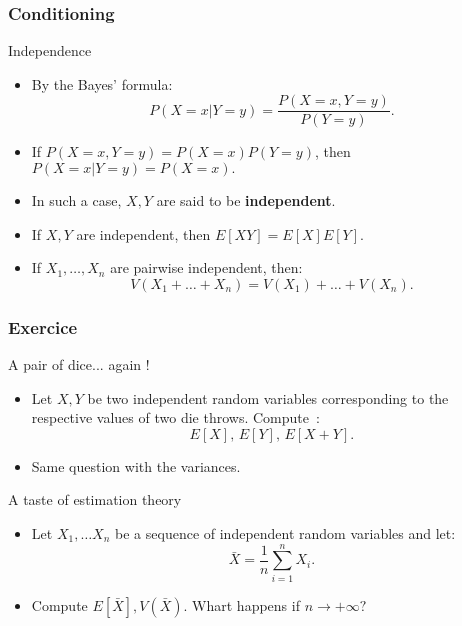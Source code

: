 \begin{frame}
    \frametitle{Conditioning}
\begin{block}{Independence}
    \begin{itemize}
        \item<+-> By the Bayes' formula:
        \begin{equation}
            P\left( X = x \vert Y = y \right) = \frac{P\left( X = x, Y = y \right)}{P(Y=y)}.
        \end{equation}
        \item<+-> If $P\left( X = x, Y = y \right) = P\left( X = x \right)P\left( Y = y \right)$, then
        $P\left( X = x \vert Y = y \right) = P\left( X = x \right).$
        \item<+-> In such a case, $X,Y$ are said to be \textbf{independent}.
        \item<+-> If $X,Y$ are independent, then $E\left[ XY \right] = E[X]E[Y].$
        \item<+-> If $X_1, \dots, X_n$ are pairwise independent, then:
        \begin{equation}
            V\left( X_1 + \dots + X_n \right) = V\left( X_1 \right) + \dots + V\left( X_n \right).
        \end{equation}
    \end{itemize}
\end{block}
\end{frame}
\begin{frame}
    \frametitle{Exercice}
    \begin{block}{A pair of dice... again !}
        \begin{itemize}
            \item<+-> Let $X,Y$ be two independent random variables corresponding
            to the respective values of two die throws. Compute~:
            \[
            E\left[ X \right], \, E\left[ Y \right], \, E\left[ X + Y \right].
            \]
            \item<+-> Same question with the variances.
        \end{itemize}
    \end{block}
    \begin{block}{A taste of estimation theory}
        \begin{itemize}
            \item<+-> Let $X_1, \dots X_n$ be a sequence of independent random variables and
            let:
            \[
            \bar{X} = \frac{1}{n} \sum_{i=1}^n X_i.
            \]
            \item<+-> Compute $E\left[ \bar{X} \right], V\left( \bar{X} \right).$ Whart happens 
            if $n \to +\infty ?$
        \end{itemize}
    \end{block}    
\end{frame}
